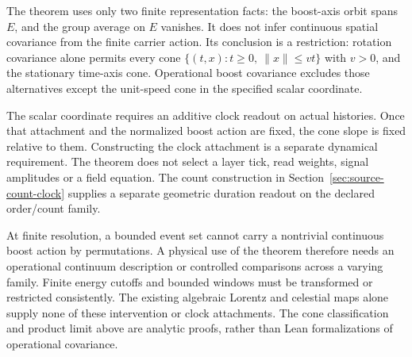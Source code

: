 The theorem uses only two finite representation facts: the boost-axis
orbit spans $E$, and the group average on $E$ vanishes. It does not infer
continuous spatial covariance from the finite carrier action. Its
conclusion is a restriction: rotation covariance alone permits every
cone $\{(t,x):t\geq0,\ \|x\|\leq vt\}$ with $v>0$, and the stationary
time-axis cone. Operational boost covariance excludes those alternatives
except the unit-speed cone in the specified scalar coordinate.

The scalar coordinate requires an additive clock readout
on actual histories. Once that attachment and the normalized boost action
are fixed, the cone slope is fixed relative to them. Constructing the
clock attachment is a separate dynamical requirement. The theorem does not select a layer tick,
read weights, signal amplitudes or a field equation. The count construction
in Section~\ref{sec:source-count-clock} supplies a separate geometric
duration readout on the declared order/count family.

At finite resolution, a bounded event set cannot carry a nontrivial
continuous boost action by permutations. A physical use of the theorem
therefore needs an operational continuum description or controlled
comparisons across a varying family. Finite energy cutoffs and bounded
windows must be transformed or restricted consistently. The existing
algebraic Lorentz and celestial maps alone supply none of these
intervention or clock attachments. The cone classification and product
limit above are analytic proofs, rather than Lean formalizations of
operational covariance.
